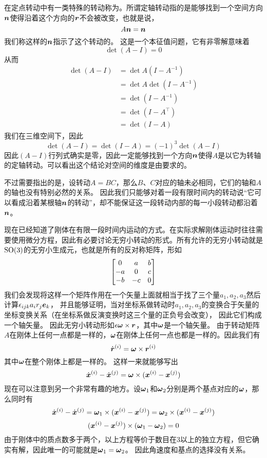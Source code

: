 在定点转动中有一类特殊的转动称为。所谓定轴转动指的是能够找到一个空间方向$\vb*{n}$使得沿着这个方向的$\vb*{r}$不会被改变，也就是说，
\[
    A \vb*{n} = \vb*{n}
\]
我们称这样的$\vb*{n}$指示了这个转动的。
这是一个本征值问题，它有非零解意味着
\[
    \det (A - I) = 0
\]
从而
\[
    \begin{aligned}
        \det (A - I) &= \det A(I - A^{-1}) \\
        &= \det A \det (I - A^{-1}) \\
        &= \det (I - A^{-1}) \\
        &= \det (I - A^\top) \\
        &= \det (I - A)
    \end{aligned}
\]
我们在三维空间下，因此
\[
    \det (A - I) = \det (I - A) = (-1)^3 \det (A - I)
\]
因此$(A-I)$行列式确实是零，因此一定能够找到一个方向$\vb*{n}$使得$A$是以它为转轴的定轴转动。可以看出这个结论对空间的维度是由要求的。

不过需要指出的是，设转动$A=BC$，那么$B$、$C$对应的轴未必相同，它们的轴和$A$的轴也没有特别必然的关系。
因此我们只能够对着一段有限时间内的转动说“它可以看成沿着某根轴$\vb*{n}$的转动”，却不能保证这一段转动内部的每一小段转动都沿着$\vb*{n}$。

现在已经知道了刚体在有限一段时间内运动的方式。在实际求解刚体运动时往往需要使用微分方程，因此有必要讨论无穷小转动的形式。所有允许的无穷小转动就是$\mathrm{SO}(3)$的无穷小生成元，也就是所有的反对称矩阵，形如
\[
    \bmqty{0 & a & b \\ -a & 0 & c \\ -b & -c & 0}
\]
我们会发现将这样一个矩阵作用在一个矢量上面就相当于找了三个量$a_1, a_2, a_3$然后计算$\epsilon_{ijk} a_i r_j \vb*{e}_k$，
并且能够证明，当对坐标系做转动时$a_1, a_2, a_3$的变换合于矢量的坐标变换关系（在坐标系做反演变换时这三个量的正负号会改变），
因此它们构成一个轴矢量。
因此无穷小转动形如$\epsilon \vb*{\omega} \times \vb*{r}$，其中$\vb*{\omega}$是一个轴矢量。
由于转动矩阵$A$在刚体上任何一点都是一样的，$\vb*{\omega}$在刚体上任何一点也都是一样的。因此我们有
\begin{equation}
    \dot{\vb*{r}}^{(i)} = \vb*{\omega} \times \vb*{r}^{(i)}
    \label{eq:body-frame-motion}
\end{equation}
其中$\vb*{\omega}$在整个刚体上都是一样的。
这样一来就能够写出
\begin{equation}
    \dot{\vb*{x}}^{(i)} - \dot{\vb*{x}}^{(j)} = \vb*{\omega} \times (\vb*{x}^{(i)} - \vb*{x}^{(j)})
\end{equation}
现在可以注意到另一个非常有趣的地方。设$\vb*{\omega}_1$和$\vb*{\omega}_2$分别是两个基点对应的$\vb*{\omega}$，那么同时有
\[
    \dot{\vb*{x}}^{(i)} - \dot{\vb*{x}}^{(j)} = \vb*{\omega}_1 \times (\vb*{x}^{(i)} - \vb*{x}^{(j)}) = \vb*{\omega}_2 \times (\vb*{x}^{(i)} - \vb*{x}^{(j)})
\]
\[
    (\vb*{x}^{(i)} - \vb*{x}^{(j)}) \times (\vb*{\omega}_1 - \vb*{\omega}_2) = 0
\]
由于刚体中的质点数多于两个，以上方程等价于数目在3以上的独立方程，但它确实有解，因此唯一的可能就是$\vb*{\omega}_1 = \vb*{\omega}_2$。
因此角速度和基点的选择没有关系。

